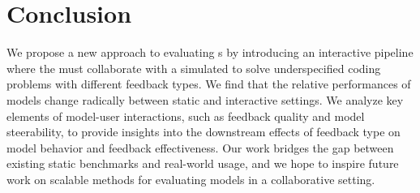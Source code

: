 \section{Conclusion}
We propose a new approach to evaluating \cm s by introducing an interactive pipeline where the \cm{} must collaborate with a simulated \user{} to solve underspecified coding problems with different feedback types.
We find that the relative performances of models change radically between static and interactive settings.
We analyze key elements of model-user interactions, such as feedback quality and model steerability, to provide insights into the downstream effects of feedback type on model behavior and feedback effectiveness.
Our work bridges the gap between existing static benchmarks and real-world usage, and we hope to inspire future work on scalable methods for evaluating models in a collaborative setting.